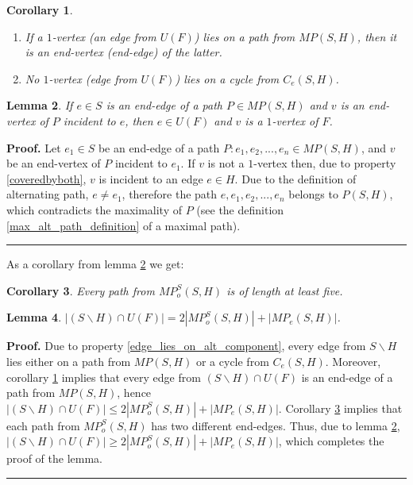 \documentclass[a4paper, 12pt]{article}
\newtheorem{lemma}{Lemma}[subsection]
\newtheorem{corollary}[lemma]{Corollary}
\newenvironment{proof}[1][Proof]{\noindent\textbf{#1.} }{\ \rule{0.5em}{0.5em}}
\begin{document}
\begin{corollary} \label{U_on_paths}\
\renewcommand{\labelenumi}{(\arabic{enumi})}
\begin{enumerate}
\item \label{one_is_end_vertex} If a $1$-vertex (an edge from $U(F)$)
lies on a path from $MP(S,H)$, then it is an end-vertex (end-edge)
of the latter.

\item \label{no_U_lies_on_cycles} No $1$-vertex (edge from $U(F)$) lies on a cycle
from $C_e(S,H)$.
\end{enumerate}
\end{corollary}

\begin{lemma} \label{S_on_U}
If $e \in S$ is an end-edge of a path $P \in MP(S,H)$ and $v$ is an
end-vertex of $P$ incident to $e$, then $e \in U(F)$ and $v$ is a
$1$-vertex of $F$.
\end{lemma}
\begin{proof}
Let $e_1 \in S$ be an end-edge of a path $P : e_1, e_2, ..., e_n \in
MP(S,H)$, and $v$ be an end-vertex of $P$ incident to $e_1$. If $v$
is not a $1$-vertex then, due to property \ref{coveredbyboth}, $v$
is incident to an edge $e \in H$. Due to the definition of
alternating path, $e \neq e_1$, therefore the path $e, e_1, e_2,
..., e_n$ belongs to $P(S, H)$, which contradicts the maximality of
$P$ (see the definition \ref{max_alt_path_definition} of a maximal
path).
\end{proof}

\bigskip

As a corollary from lemma \ref{S_on_U} we get:
\begin{corollary}\label{odd_S_paths_length}
Every path from $MP_o^S(S,H)$ is of length at least five.
\end{corollary}

\begin{lemma}\label{cardinality_ScapU}
$|(S \backslash H) \cap U(F)| = 2|MP_o^S(S,H)| + |MP_e(S,H)|$.
\end{lemma}
\begin{proof}
Due to property \ref{edge_lies_on_alt_component}, every edge from $S
\backslash H$ lies either on a path from $MP(S,H)$ or a cycle from
$C_e(S,H)$. Moreover, corollary \ref{U_on_paths} implies that every
edge from $(S \backslash H) \cap U(F)$ is an end-edge of a path from
$MP(S,H)$, hence $|(S \backslash H) \cap U(F)| \leq 2|MP_o^S(S, H)|
+ |MP_e(S, H)|$. Corollary \ref{odd_S_paths_length} implies that
each path from $MP_o^S(S, H)$ has two different end-edges. Thus, due
to lemma \ref{S_on_U}, $|(S \backslash H) \cap U(F)| \geq
2|MP_o^S(S, H)| + |MP_e(S, H)|$, which completes the proof of the
lemma.
\end{proof}
\end{document}
